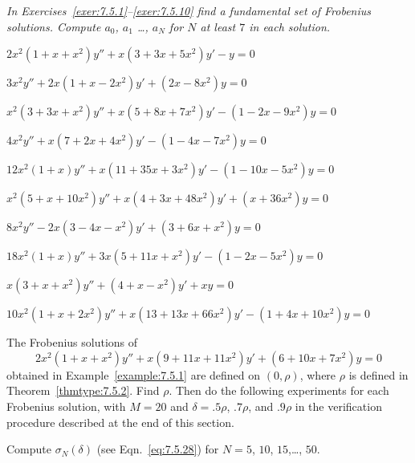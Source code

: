 \noindent
{\it In Exercises~\ref{exer:7.5.1}--\ref{exer:7.5.10} find a fundamental set of Frobenius solutions.
Compute $a_{0}$, $a_{1}$ \dots, $a_{N}$ for $N$ at least $7$ in each solution.}
\begin{exerciselist}
  \item\label{exer:7.5.1} \Cex $2x^{2}(1+x+x^{2})y''+x(3+3x+5x^{2})y'-y=0$

  \item\label{exer:7.5.2} \Cex $3x^{2}y''+2x(1+x-2x^{2})y'+(2x-8x^{2})y=0$

  \item\label{exer:7.5.3} \Cex $x^{2}(3+3x+x^{2})y''+x(5+8x+7x^{2})y'-(1-2x-9x^{2})y=0$

  \item\label{exer:7.5.4} \Cex $4x^{2}y''+x(7+2x+4x^{2})y'-(1-4x-7x^{2})y=0$

  \item\label{exer:7.5.5} \Cex $12x^{2}(1+x)y''+x(11+35x+3x^{2})y'-(1-10x-5x^{2})y=0$

  \item\label{exer:7.5.6} \Cex $x^{2}(5+x+10x^{2})y''+x(4+3x+48x^{2})y'+(x+36x^{2})y=0$

  \item\label{exer:7.5.7} \Cex $8x^{2}y''-2x(3-4x-x^{2})y'+(3+6x+x^{2})y=0$

  \item\label{exer:7.5.8} \Cex $18x^{2}(1+x)y''+3x(5+11x+x^{2})y'-(1-2x-5x^{2})y=0$

  \item\label{exer:7.5.9} \Cex $x(3+x+x^{2})y''+(4+x-x^{2})y'+xy=0$

  \item\label{exer:7.5.10} \Cex $10x^{2}(1+x+2x^{2})y''+x(13+13x+66x^{2})y'-(1+4x+10x^{2})y=0$

  \item\label{exer:7.5.11} \Lex The Frobenius solutions of
  \[
    2x^{2}(1+x+x^{2})y''+x(9+11x+11x^{2})y'+(6+10x+7x^{2})y=0
  \]
  obtained in Example~\ref{example:7.5.1} are defined on $(0,\rho)$, where $\rho$ is defined in
  Theorem~\ref{thmtype:7.5.2}. Find $\rho$. Then do the following experiments for each Frobenius
  solution, with $M=20$ and $\delta=.5\rho$, $.7\rho$, and $.9\rho$ in the verification procedure
  described at the end of this section.
  \begin{alist}
    \item %
    Compute $\sigma_{N}(\delta)$ (see Eqn.~\eqref{eq:7.5.28}) for $N=5$, $10$, $15$,\dots, $50$.


\end{alist}
\end{exerciselist}
